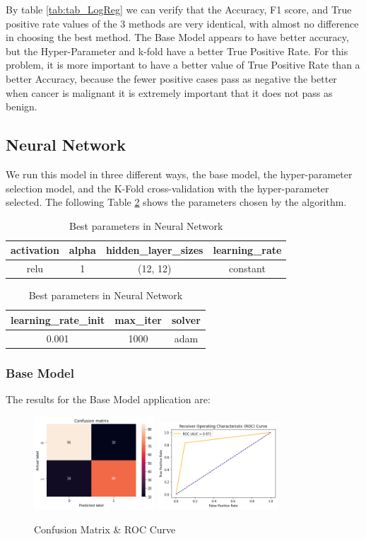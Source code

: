 \documentclass[conference]{IEEEtran}
\begin{document}
By table  \ref{tab:tab_LogReg} we can verify that the Accuracy, F1 score, and True positive rate values of the 3 methods are very identical, with almost no difference in choosing the best method. The Base Model appears to have better accuracy, but the Hyper-Parameter and k-fold have a better True Positive Rate. For this problem, it is more important to have a better value of True Positive Rate than a better Accuracy, because the fewer positive cases pass as negative the better when cancer is malignant it is extremely important that it does not pass as benign.

\subsection{Neural Network}

We run this model in three different ways, the base model, the hyper-parameter selection model, and the K-Fold cross-validation with the hyper-parameter selected. The following Table \ref{tab:tab2} shows the parameters chosen by the algorithm.

\begin{table}[h!]
    \centering
    \caption{Best parameters in Neural Network} 
    \begin{tabular}{||c c c c||} 
     \hline
     activation & alpha & hidden\_layer\_sizes & learning\_rate \\[0.5ex] 
     \hline\hline
     relu & 1 & (12, 12) & constant \\ 
    \hline
    \end{tabular}
    \begin{tabular}{||c c c||}
    \hline
    learning\_rate\_init & max\_iter & solver \\ [0.5ex] 
    \hline\hline
     0.001 & 1000 & adam\\ 
    \hline
    \end{tabular}
    \label{tab:tab2}
\end{table}

\subsubsection{Base Model}
The results for the Base Model application are:

\begin{figure}[h!]
    \includegraphics[width=4.5cm]{NN/nn1_1.png}%
    \includegraphics[width=4.5cm]{NN/nn1_2.png}%
    \caption{Confusion Matrix & ROC Curve}%
    \label{fig:conf_NN_1}%
\end{figure}
\end{document}
